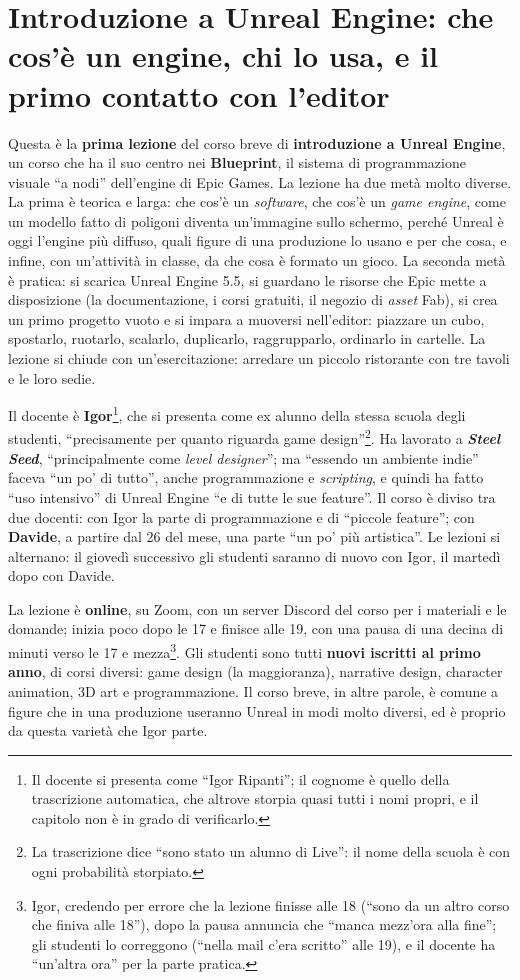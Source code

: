 \chapter[Introduzione a Unreal Engine]{Introduzione a Unreal Engine: che cos'è un
engine, chi lo usa, e il primo contatto con l'editor}
\label{ue1:cap:intro}

Questa è la \textbf{prima lezione} del corso breve di \textbf{introduzione a Unreal
Engine}, un corso che ha il suo centro nei \textbf{Blueprint}, il sistema di
programmazione visuale ``a nodi'' dell'engine di Epic Games. La lezione ha due metà
molto diverse. La prima è teorica e larga: che cos'è un \emph{software}, che cos'è un
\emph{game engine}, come un modello fatto di poligoni diventa un'immagine sullo
schermo, perché Unreal è oggi l'engine più diffuso, quali figure di una produzione lo
usano e per che cosa, e infine, con un'attività in classe, da che cosa è formato un
gioco. La seconda metà è pratica: si scarica Unreal Engine 5.5, si guardano le risorse
che Epic mette a disposizione (la documentazione, i corsi gratuiti, il negozio di
\emph{asset} Fab), si crea un primo progetto vuoto e si impara a muoversi nell'editor:
piazzare un cubo, spostarlo, ruotarlo, scalarlo, duplicarlo, raggrupparlo, ordinarlo
in cartelle. La lezione si chiude con un'esercitazione: arredare un piccolo
ristorante con tre tavoli e le loro sedie.

Il docente è \textbf{Igor}\footnote{Il docente si presenta come ``Igor Ripanti''; il
cognome è quello della trascrizione automatica, che altrove storpia quasi tutti i nomi
propri, e il capitolo non è in grado di verificarlo.}, che si presenta come ex alunno
della stessa scuola degli studenti, ``precisamente per quanto riguarda game
design''\footnote{La trascrizione dice ``sono stato un alunno di Live'': il nome della
scuola è con ogni probabilità storpiato.}. Ha lavorato a \textbf{\emph{Steel Seed}},
``principalmente come \emph{level designer}''; ma ``essendo un ambiente indie'' faceva
``un po' di tutto'', anche programmazione e \emph{scripting}, e quindi ha fatto ``uso
intensivo'' di Unreal Engine ``e di tutte le sue feature''. Il corso è diviso tra due
docenti: con Igor la parte di programmazione e di ``piccole feature''; con
\textbf{Davide}, a partire dal 26 del mese, una parte ``un po' più artistica''. Le
lezioni si alternano: il giovedì successivo gli studenti saranno di nuovo con Igor, il
martedì dopo con Davide.

La lezione è \textbf{online}, su Zoom, con un server Discord del corso per i
materiali e le domande; inizia poco dopo le 17 e finisce alle 19, con una pausa di una
decina di minuti verso le 17 e mezza\footnote{Igor, credendo per errore che la lezione
finisse alle 18 (``sono da un altro corso che finiva alle 18''), dopo la pausa annuncia
che ``manca mezz'ora alla fine''; gli studenti lo correggono (``nella mail c'era
scritto'' alle 19), e il docente ha ``un'altra ora'' per la parte pratica.}. Gli
studenti sono tutti \textbf{nuovi iscritti al primo anno}, di corsi diversi: game
design (la maggioranza), narrative design, character animation, 3D art e
programmazione. Il corso breve, in altre parole, è comune a figure che in una
produzione useranno Unreal in modi molto diversi, ed è proprio da questa varietà che
Igor parte.

